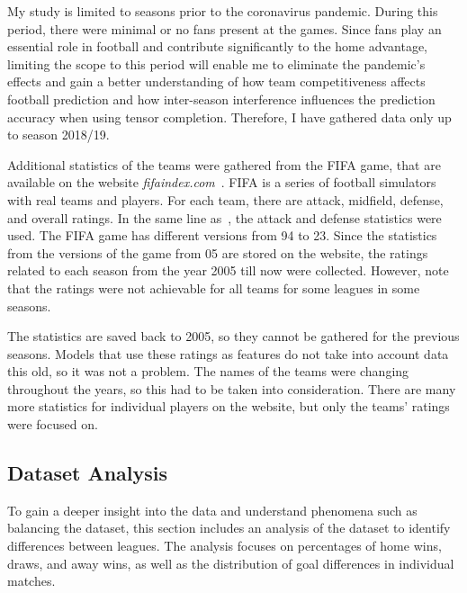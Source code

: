 \documentclass[thesis=M,english]{FITthesis}[2019/12/23]
\begin{document}
My study is limited to seasons prior to the coronavirus pandemic. During this period, there were minimal or no fans present at the games. Since fans play an essential role in football and contribute significantly to the home advantage, limiting the scope to this period will enable me to eliminate the pandemic's effects and gain a better understanding of how team competitiveness affects football prediction and how inter-season interference influences the prediction accuracy when using tensor completion. Therefore, I have gathered data only up to season 2018/19.

Additional statistics of the teams were gathered from the FIFA game, that are available on the website \textit{fifaindex.com}~\cite{fifa}. FIFA is a series of football simulators with real teams and players. For each team, there are attack, midfield, defense, and overall ratings. In the same line as~\cite{BPL_logistic_regression}, the attack and defense statistics were used. The FIFA game has different versions from 94 to 23. Since the statistics from the versions of the game from 05 are stored on the website, the ratings related to each season from the year 2005 till now were collected. However, note that the ratings were not achievable for all teams for some leagues in some seasons.

The statistics are saved back to 2005, so they cannot be gathered for the previous seasons. Models that use these ratings as features do not take into account data this old, so it was not a problem. The names of the teams were changing throughout the years, so this had to be taken into consideration. There are many more statistics for individual players on the website, but only the teams' ratings were focused on.

\subsection{Dataset Analysis}
\label{dataset_analysis}

To gain a deeper insight into the data and understand phenomena such as balancing the dataset, this section includes an analysis of the dataset to identify differences between leagues. The analysis focuses on percentages of home wins, draws, and away wins, as well as the distribution of goal differences in individual matches.
\end{document}
